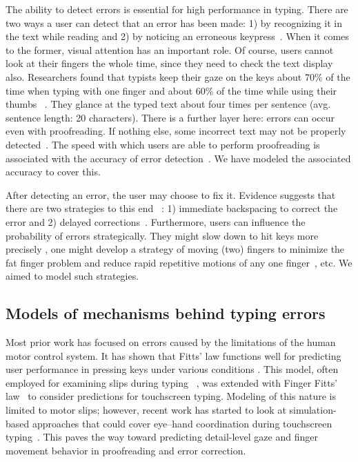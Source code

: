 The ability to detect errors is essential for high performance in typing. 
There are two ways a user can detect that an error has been made:
1) by recognizing it in the text while reading and
2) by noticing an erroneous keypress~\cite{logan2010cognitive}. 
%
When it comes to the former, visual attention has an important role.
Of course, users cannot look at their fingers the whole time, since they need to check the text display also.
%
Researchers found that typists keep their gaze on the keys about 70\% of the time when typing with one finger and about 60\% of the time while using their thumbs ~\cite{jiang2020we}.
% 
They glance at the typed text about four times per sentence (avg. sentence length: 20 characters).
There is a further layer here: errors can occur even with proofreading.
If nothing else, some incorrect text may not be properly detected~\cite{haber1981error}. 
The speed with which users are able to perform proofreading is associated with the accuracy of error detection~\cite{pilotti2009text}.
We have modeled the associated accuracy to cover this.


After detecting an error, the user may choose to fix it.
Evidence suggests that there are two strategies to this end ~\cite{pinet2022correction}: 1) immediate backspacing to correct the error and 2) delayed corrections~\cite{arif2009analysis, jiang2020we}.
%
Furthermore, users can influence the probability of errors strategically.
They might slow down to hit keys more precisely \cite{bi2013ffitts},
one might develop a strategy of moving (two) fingers to minimize the fat finger problem and reduce rapid repetitive motions of any one finger~\cite{cerni2016}, etc.
We aimed to model such strategies. 

\subsection{Models of mechanisms behind typing errors}

Most prior work has focused on errors caused by the limitations of the human motor control system.
%
It has shown that Fitts' law functions well for predicting user performance in pressing keys under various conditions \cite{zhai2004characterizing}.
This model, often employed for examining slips during typing ~\cite{wobbrock2008error},
was extended with Finger Fitts' law~\cite{bi2013ffitts} to consider predictions for touchscreen typing. 
Modeling of this nature is limited to motor slips; however,
%
recent work has started to look at simulation-based approaches that could cover eye--hand coordination during touchscreen typing~\cite{jokinen2021touchscreen}. 
This paves the way toward predicting detail-level gaze and finger movement behavior in proofreading and error correction.

